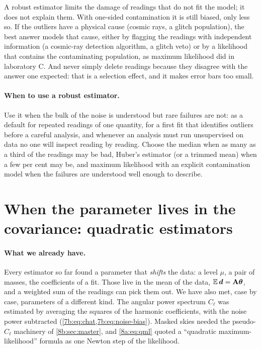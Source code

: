 \begin{pitfall}
A robust estimator limits the damage of readings that do not fit the model;
it does not explain them. With one-sided contamination it is still biased,
only less so. If the outliers have a physical cause (cosmic rays, a glitch
population), the best answer models that cause, either by flagging the
readings with independent information (a cosmic-ray detection algorithm, a
glitch veto) or by a likelihood that contains the contaminating population,
as maximum likelihood did in laboratory C. And never simply delete readings
because they disagree with the answer one expected: that is a selection
effect, and it makes error bars too small.
\end{pitfall}

\paragraph{When to use a robust estimator.}
Use it when the bulk of the noise is understood but rare failures are not:
as a default for repeated readings of one quantity, for a first fit that
identifies outliers before a careful analysis, and whenever an analysis must
run unsupervised on data no one will inspect reading by reading. Choose the
median when as many as a third of the readings may be bad, Huber's estimator
(or a trimmed mean) when a few per cent may be, and maximum likelihood with
an explicit contamination model when the failures are understood well
enough to describe.
\section{When the parameter lives in the covariance: quadratic estimators}
\label{T5a:sec:quadratic}

\paragraph{What we already have.}
Every estimator so far found a parameter that \emph{shifts} the data: a
level $\mu$, a pair of masses, the coefficients of a fit. Those live in the
mean of the data, $\E\data=\mathbf A\params$, and a weighted sum of the
readings can pick them out. We have also met, case by case, parameters of a
different kind. The angular power spectrum $C_\ell$ was estimated by
averaging the squares of the harmonic coefficients, with the noise power
subtracted (\cref{7b:eq:chat,7b:eq:noise-bias}). Masked skies needed the
pseudo-$C_\ell$ machinery of \cref{8b:sec:master}, and \cref{8a:eq:qml}
quoted a ``quadratic maximum-likelihood'' formula as one Newton step of the
likelihood.

